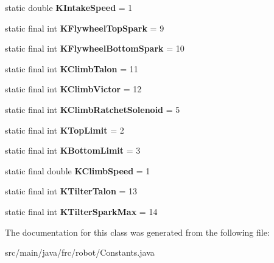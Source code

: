 \begin{DoxyCompactItemize}
\item 
\mbox{\label{classfrc_1_1robot_1_1_constants_a9f8ffbe41c8e56e96241a64d885f0237}} 
static double {\bfseries K\+Intake\+Speed} = 1
\item 
\mbox{\label{classfrc_1_1robot_1_1_constants_abd9b63365a08b6d21b004ac89a92eb57}} 
static final int {\bfseries K\+Flywheel\+Top\+Spark} = 9
\item 
\mbox{\label{classfrc_1_1robot_1_1_constants_a26ae636555373fdc96232f0aeb3b5ac5}} 
static final int {\bfseries K\+Flywheel\+Bottom\+Spark} = 10
\item 
\mbox{\label{classfrc_1_1robot_1_1_constants_a9d092c9a3a81987a458f5f522859baae}} 
static final int {\bfseries K\+Climb\+Talon} = 11
\item 
\mbox{\label{classfrc_1_1robot_1_1_constants_a57ec783c8f6c2dba36ec876aadce8667}} 
static final int {\bfseries K\+Climb\+Victor} = 12
\item 
\mbox{\label{classfrc_1_1robot_1_1_constants_a0888fc9dc6067ff185d5ec6a4f73794d}} 
static final int {\bfseries K\+Climb\+Ratchet\+Solenoid} = 5
\item 
\mbox{\label{classfrc_1_1robot_1_1_constants_a6aaa6d096e7ce9dede954b79fd453c78}} 
static final int {\bfseries K\+Top\+Limit} = 2
\item 
\mbox{\label{classfrc_1_1robot_1_1_constants_a43a8666442b1899af256d6ad74a9f6bc}} 
static final int {\bfseries K\+Bottom\+Limit} = 3
\item 
\mbox{\label{classfrc_1_1robot_1_1_constants_a6cb90910873971dfb72591357ca44b4d}} 
static final double {\bfseries K\+Climb\+Speed} = 1
\item 
\mbox{\label{classfrc_1_1robot_1_1_constants_a7b4e8d8ad66ad9e14e2e3bfd4e6d3de0}} 
static final int {\bfseries K\+Tilter\+Talon} = 13
\item 
\mbox{\label{classfrc_1_1robot_1_1_constants_ae7805cf3008e7e6b50a9a3cb0b491521}} 
static final int {\bfseries K\+Tilter\+Spark\+Max} = 14
\end{DoxyCompactItemize}


The documentation for this class was generated from the following file\+:\begin{DoxyCompactItemize}
\item 
src/main/java/frc/robot/Constants.\+java\end{DoxyCompactItemize}
